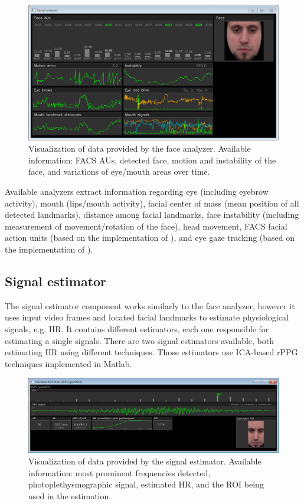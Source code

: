 \begin{figure}
    \centering
    \includegraphics[width=\textwidth]{Content/figures/tool-ui-face-analyzer.png}
    \caption{Visualization of data provided by the face analyzer. Available information: FACS AUs, detected face, motion and instability of the face, and variations of eye/mouth areas over time.}
    \label{fig:tool-ui-face-analyzer}
\end{figure}

Available analyzers extract information regarding eye (including eyebrow activity), mouth (lips/mouth activity), facial center of mass (mean position of all detected landmarks), distance among facial landmarks, face instability (including measurement of movement/rotation of the face), head movement, FACS facial action units (based on the implementation of \textcite{baltruvsaitis2015cross}), and eye gaze tracking (based on the implementation of \textcite{wood2015rendering}).

\subsection{Signal estimator}

The signal estimator component works similarly to the face analyzer, however it uses input video frames and located facial landmarks to estimate physiological signals, e.g. HR. It contains different estimators, each one responsible for estimating a single signals. There are two signal estimators available, both estimating HR using different techniques. Those estimators use ICA-based rPPG techniques \parencite{poh2010non,poh2011advancements} implemented in Matlab.

\begin{figure}
    \centering
    \includegraphics[width=\textwidth]{Content/figures/tool-ui-signal-estimator.png}
    \caption{Visualization of data provided by the signal estimator. Available information: most prominent frequencies detected, photoplethysmographic signal, estimated HR, and the ROI being used in the estimation.}
    \label{fig:tool-ui-signal-estimator}
\end{figure}

